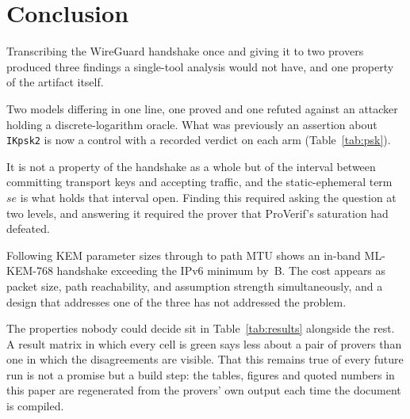 \section{Conclusion}

Transcribing the WireGuard handshake once and giving it to two provers
produced three findings a single-tool analysis would not have, and one
property of the artifact itself.

 Two models
differing in one line, one proved and one refuted against an attacker holding
a discrete-logarithm oracle. What was previously an assertion about
\texttt{IKpsk2} is now a control with a recorded verdict on each arm
(Table~\ref{tab:psk}).

 It is not a property of
the handshake as a whole but of the interval between committing transport keys
and accepting traffic, and the static-ephemeral term \(se\) is what holds that
interval open. Finding this required asking the question at two levels, and
answering it required the prover that ProVerif's saturation had defeated.

 Following KEM parameter sizes
through to path MTU shows an in-band ML-KEM-768 handshake exceeding the IPv6
minimum by \wgOvershoot\,B. The cost appears as packet size, path
reachability, and assumption strength simultaneously, and a design that
addresses one of the three has not addressed the problem.

 The \wgNonterm{}
properties nobody could decide sit in Table~\ref{tab:results} alongside the
rest. A
result matrix in which every cell is green says less about a pair of provers
than one in which the disagreements are visible. That this remains true of
every future run is not a promise but a build step: the tables, figures and
quoted numbers in this paper are regenerated from the provers' own output
each time the document is compiled.
